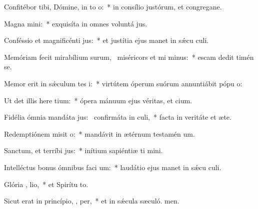 \item Confitébor tibi, Dómine, in to  o:~* in consílio justórum, et congregane.
\item Magna  mini:~* exquisíta in omnes voluntá jus.
\item Conféssio et magnificénti  jus:~* et justítia ejus manet in sǽcu culi.
\item Memóriam fecit mirabílium surum,~\pscross{} miséricors et mi minus:~* escam dedit timén se.
\item Memor erit in sǽculum tes i:~* virtútem óperum suórum annuntiábit pópu o:
\item Ut det illis here tium:~* ópera mánuum ejus véritas, et cium.
\item Fidélia ómnia mandáta jus:~\pscross{} confirmáta in  culi,~* facta in veritáte et æte.
\item Redemptiónem misit  o:~* mandávit in ætérnum testamén um.
\item Sanctum, et terríbi  jus:~* inítium sapiéntiæ ti mini.
\item Intelléctus bonus ómnibus faci um:~* laudátio ejus manet in sǽcu culi.
\item Glória ,  lio,~* et Spirítu to.
\item Sicut erat in princípio,  ,  per,~* et in sǽcula sæculó. men.
